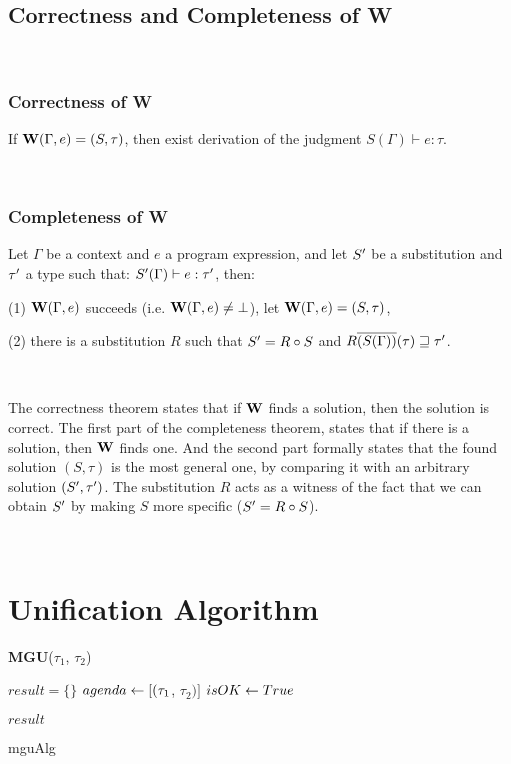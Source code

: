 \documentclass[a4paper,oneside]{memoir}
\begin{document}
\subsection{Correctness and Completeness of W}

~

\subsubsection{Correctness of W}

If $\operatorname{\textbf{W}}(\Gamma, e) = (S, \tau)$, then exist derivation of the judgment $S(\Gamma) \vdash e : \tau$.

~

\subsubsection{Completeness of W}

Let $\Gamma$ be a context and $e$ a program expression,
and let $S^\prime$ be a substitution and $\tau^\prime$ a type such that:
$ S^\prime(\Gamma) \vdash e : \tau^\prime $, 
then:

(1) $\operatorname{\textbf{W}}(\Gamma,e)$ succeeds (i.e. $\operatorname{\textbf{W}}(\Gamma,e) \neq \bot$), 
let $\operatorname{\textbf{W}}(\Gamma,e) = (S, \tau)$,

(2) there is a substitution $R$ such that $S^\prime = R \circ S$ 
and $R\overline{(S(\Gamma))}(\tau) \sqsupseteq \tau^\prime$. 

~ 

The correctness theorem states that if $\operatorname{\textbf{W}}$ finds a solution, then the solution is correct.
The first part of the completeness theorem, states that if there is a solution, then $\operatorname{\textbf{W}}$ finds one. And the second part formally states that the found solution $(S,\tau)$ is the most general one, by comparing it with an arbitrary solution $(S^\prime,\tau^\prime)$. The substitution $R$ acts as a witness of the fact that we can obtain $S^\prime$ by making $S$ more specific ($S^\prime = R \circ S$).  


~



\section{Unification Algorithm}

{\textbf{MGU}($\tau_1$, $\tau_2$)}{
	
	$result = \{\}$ \;
	$agenda \leftarrow [(\tau_1$, $\tau_2)]$ \;	
	$isOK \leftarrow True$ \;

	\;	
	
	\;
	
	 {
		\Return $result$
	} \Else {
		\Return $\bot$				
	}
	
}{mguAlg}
\end{document}
